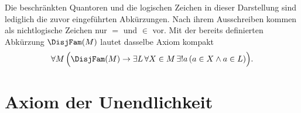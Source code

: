 \documentclass[main.tex]{subfiles}
\begin{document}
Die beschränkten Quantoren und die logischen Zeichen in dieser Darstellung
sind lediglich die zuvor eingeführten Abkürzungen. Nach ihrem Ausschreiben
kommen als nichtlogische Zeichen nur \(=\) und \(\in\) vor. Mit der bereits
definierten Abkürzung \(\DisjFam(M)\) lautet dasselbe Axiom kompakt
\[
  \forall M\,\Bigl(
    \DisjFam(M)\rightarrow
    \exists L\,\forall X\in M\,\exists!a\,
    (a\in X\land a\in L)
  \Bigr).
\]

\section{Axiom der Unendlichkeit}





\end{document}
